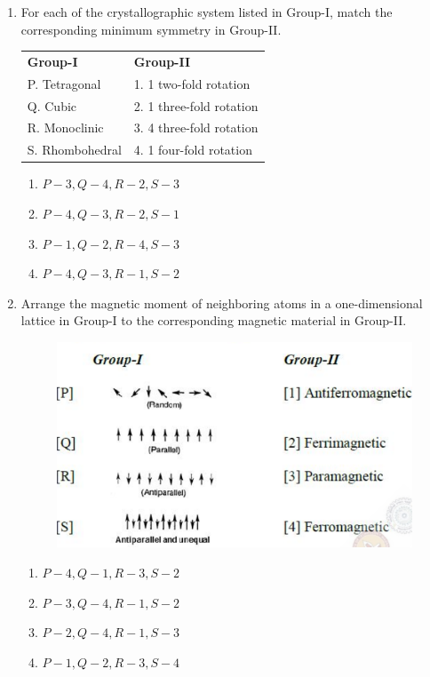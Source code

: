 \documentclass[journal]{IEEEtran}
\theoremstyle{remark}
\begin{document}
\begin{enumerate}
\item For each of the crystallographic system listed in Group-I, match the corresponding minimum symmetry in Group-II. \hfill{}
\begin{center}
\begin{tabular}{ll}
\textbf{Group-I} & \textbf{Group-II} \\
P. Tetragonal & 1. 1 two-fold rotation \\
Q. Cubic & 2. 1 three-fold rotation \\
R. Monoclinic & 3. 4 three-fold rotation \\
S. Rhombohedral & 4. 1 four-fold rotation \\
\end{tabular}
\end{center}
\begin{multicols}{2}
\begin{enumerate}
    \item $P-3, Q-4, R-2, S-3$
    \item $P-4, Q-3, R-2, S-1$
    \item $P-1, Q-2, R-4, S-3$
    \item $P-4, Q-3, R-1, S-2$
\end{enumerate}
\end{multicols}

\item Arrange the magnetic moment of neighboring atoms in a one-dimensional lattice in Group-I to the corresponding magnetic material in Group-II. \hfill{}
\begin{figure}[H]
    \centering
    \includegraphics[width=0.7\columnwidth]{figs/Q.46.png}
    \caption{}
    \label{fig:placeholder}
\end{figure}
\begin{multicols}{2}
\begin{enumerate}
    \item $P-4, Q-1, R-3, S-2$
    \item $P-3, Q-4, R-1, S-2$
    \item $P-2, Q-4, R-1, S-3$
    \item $P-1, Q-2, R-3, S-4$
\end{enumerate}
\end{multicols}


\end{enumerate}
\end{document}
